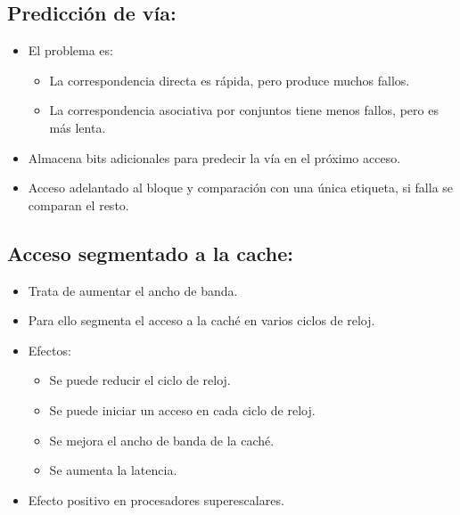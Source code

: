 \documentclass[12pt, twoside, openright]{report} %
\begin{document}
  \subsection{Predicción de vía:}

    \begin{itemize}
    
    \item
      El problema es:

      \begin{itemize}
      
      \item
        La correspondencia directa es rápida, pero produce muchos
        fallos.
      \item
        La correspondencia asociativa por conjuntos tiene menos fallos,
        pero es más lenta.
      \end{itemize}
    \item
      Almacena bits adicionales para predecir la vía en el próximo
      acceso.
    \item
      Acceso adelantado al bloque y comparación con una única etiqueta,
      si falla se comparan el resto.
    \end{itemize}
  \subsection{Acceso segmentado a la cache:}

    \begin{itemize}
    
    \item
      Trata de aumentar el ancho de banda.
    \item
      Para ello segmenta el acceso a la caché en varios ciclos de reloj.
    \item
      Efectos:

      \begin{itemize}
      
      \item
        Se puede reducir el ciclo de reloj.
      \item
        Se puede iniciar un acceso en cada ciclo de reloj.
      \item
        Se mejora el ancho de banda de la caché.
      \item
        Se aumenta la latencia.
      \end{itemize}
    \item
      Efecto positivo en procesadores superescalares.
    \end{itemize}
\end{document}
